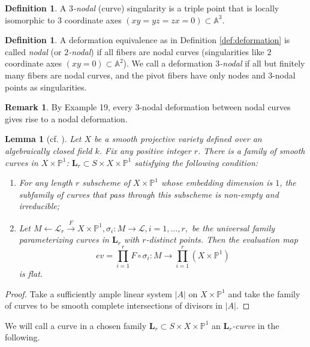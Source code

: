 \documentclass{amsart}
\newtheorem{lem}[theorem]{Lemma}
\theoremstyle{definition}
\newtheorem{defn}[theorem]{Definition}
\newtheorem{rem}[theorem]{Remark}
\theoremstyle{remark}
\newcommand{\mbb}{\mathbb}
\newcommand{\AAA}{\mbb{A}}
\newcommand{\PP}{\mbb{P}}
\begin{document}
\begin{defn}
    A \emph{$3$-nodal} (curve) singularity is a triple point that is locally isomorphic to $3$ coordinate axes $(xy = yz = zx = 0)\subset \AAA^3$.
\end{defn}

\begin{defn}\label{def:3nodal}
    A deformation equivalence as in Definition \ref{def:deformation} is called \emph{nodal} (or \emph{$2$-nodal}) if all fibers are nodal curves (singularities like $2$ coordinate axes $(xy=0)\subset\AAA^2$).
We call a deformation \emph{$3$-nodal} if all but finitely many fibers are nodal curves, and the pivot fibers have only nodes and $3$-nodal points as singularities.
\end{defn}
\begin{rem}\label{rem:3to2}
    By \cite{Kollar_Tian} Example 19, every $3$-nodal deformation between nodal curves gives rise to a nodal deformation.
\end{rem}

\begin{lem}[{cf. \cite[(42.2)-(42.5)]{Kollar_Tian}}]\label{lem:r-connect}
    Let $X$ be a smooth projective variety defined over an algebraically closed  field $k$. Fix any positive integer $r$. There is a family of smooth curves in $X \times \PP^1$:
    $\mathbf{L}_r \subset S \times X \times \PP^1$ satisfying the following condition: 
    \begin{enumerate}
        \item For any length $r$ subscheme of $X \times \PP^1$ whose embedding dimension is $1$, the subfamily of curves that pass through this subscheme is non-empty and irreducible;
        \item Let $M \leftarrow \mathcal{L}_r \xrightarrow{F} X \times \PP^1, \sigma_i: M \to \mathcal{L}, i=1, \ldots, r,$ be the universal family parameterizing curves in $\mathbf{L}_r$ with $r$-distinct points. Then the evaluation map \[
        ev=\prod_{i=1}^r F\circ \sigma_i: M \to \prod_{i=1}^r(X \times \PP^1) \]
        is flat.
    \end{enumerate}
\end{lem}
\begin{proof}
    Take a sufficiently ample linear system $|A|$ on $X\times \PP^1$ and take the family of curves to be smooth complete intersections of divisors in $|A|$.
\end{proof}
We will call a curve in a chosen family $\mathbf{L}_r\subset S \times X \times \PP^1$ an \emph{$\mathbf{L}_r$-curve} in the following.
\end{document}

